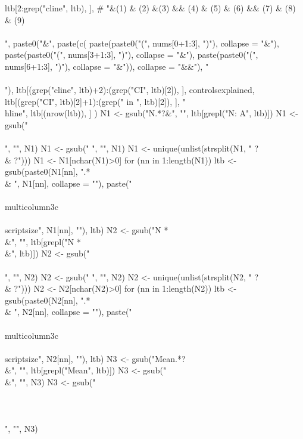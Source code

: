 \begin{Schunk}
\begin{Sinput}
{{{        ltb[2:grep("cline", ltb), ],
        #  "&(1) & (2) &(3) && (4) & (5) & (6) && (7) & (8) & (9)\\\\",
        paste0("&", paste(c(
            paste(paste0("(", nums[0+1:3], ")"), collapse = "&"), 
            paste(paste0("(", nums[3+1:3], ")"), collapse = "&"),
            paste(paste0("(", nums[6+1:3], ")"), collapse = "&")), collapse = "&&"),
          "\\\\"),
        ltb[(grep("cline", ltb)+2):(grep("CI", ltb)[2]), ],
        controlsexplained,
        ltb[(grep("CI", ltb)[2]+1):(grep(" in ", ltb)[2]), ],
        "\\hline",
        ltb[(nrow(ltb)), ]
        )
      N1 <- gsub("N.*?&", "", ltb[grepl("N: A", ltb)])
      N1 <- gsub("\\\\", "", N1)
      N1 <- gsub(" ", "", N1)
      N1 <- unique(unlist(strsplit(N1, " ?\\& ?")))
      N1 <- N1[nchar(N1)>0]
      for (nn in 1:length(N1)) 
        ltb <- gsub(paste0(N1[nn], ".*\\& ", N1[nn], collapse = ""), 
          paste("\\\\multicolumn{3}{c}{\\\\scriptsize", N1[nn], "}"), ltb)
      N2 <- gsub("N *\\&", "", ltb[grepl("N *\\&", ltb)])
      N2 <- gsub("\\\\", "", N2)
      N2 <- gsub(" ", "", N2)
      N2 <- unique(unlist(strsplit(N2, " ?\\& ?")))
      N2 <- N2[nchar(N2)>0]
      for (nn in 1:length(N2)) 
        ltb <- gsub(paste0(N2[nn], ".*\\& ", N2[nn], collapse = ""), 
          paste("\\\\multicolumn{3}{c}{\\\\scriptsize", N2[nn], "}"), ltb)
      N3 <- gsub("Mean.*?\\&", "", ltb[grepl("Mean", ltb)])
      N3 <- gsub("\\&", "", N3)
      N3 <- gsub("\\\\\\\\", "", N3)
}}}
\end{Sinput}
\end{Schunk}
